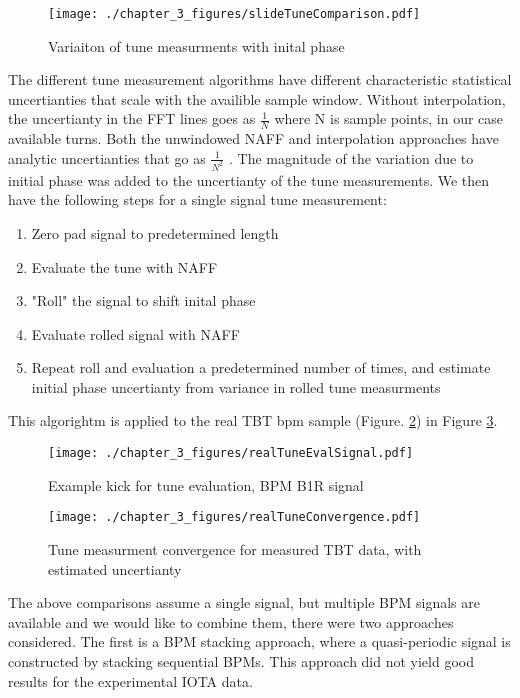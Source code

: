 \begin{figure}
	\centering
	\texttt{[image: ./chapter\_3\_figures/slideTuneComparison.pdf]}
	\caption{Variaiton of tune measurments with inital phase}
	\label{fig:baseRoll}
\end{figure}

The different tune measurement algorithms have different characteristic statistical uncertianties that scale with the availible sample window. Without interpolation, the uncertianty in the FFT lines goes as $\frac{1}{N}$ where N is sample points, in our case available turns. Both the unwindowed NAFF and interpolation approaches have analytic uncertianties that go as $\frac{1}{N^2}$ \cite{zisopolousRefined,bartoliniTune}. The magnitude of the variation due to initial phase was added to the uncertianty of the tune measurements. We then have the following steps for a single signal tune measurement:

\begin{enumerate}
	\item{Zero pad signal to predetermined length}
	\item{Evaluate the tune with NAFF}
	\item{"Roll" the signal to shift inital phase}
	\item{Evaluate rolled signal with NAFF}
	\item{Repeat roll and evaluation a predetermined number of times, and estimate initial phase uncertianty from variance in rolled tune measurments}
\end{enumerate}

This algorightm is applied to the real TBT bpm sample (Figure. \ref{fig:realEvalSig}) in  Figure \ref{fig:measConvRoll}.

\begin{figure}
	\centering \texttt{[image: ./chapter\_3\_figures/realTuneEvalSignal.pdf]}
	\caption{Example kick for tune evaluation, BPM B1R signal}
	\label{fig:realEvalSig}
\end{figure}


\begin{figure}
	\centering \texttt{[image: ./chapter\_3\_figures/realTuneConvergence.pdf]}
	\caption{Tune measurment convergence for measured TBT data, with estimated uncertianty}
	\label{fig:measConvRoll}
\end{figure}


The above comparisons assume a single signal, but multiple BPM signals are available and we would like to combine them, there were two approaches considered. The first is a BPM stacking approach, where a quasi-periodic signal is constructed \cite{zisopolousRefined} by stacking sequential BPMs. This approach did not yield good results for the experimental IOTA data.

